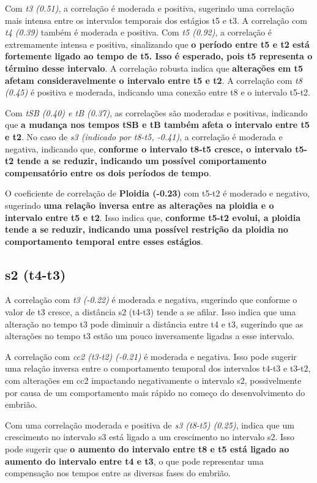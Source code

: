 Com \textit{t3 (0.51)}, a correlação é moderada e positiva, sugerindo uma correlação mais intensa entre os intervalos temporais dos estágios t5 e t3. A correlação com \textit{t4 (0.39)} também é moderada e positiva. Com \textit{t5 (0.92)}, a correlação é extremamente intensa e positiva, sinalizando que \textbf{o período entre t5 e t2 está fortemente ligado ao tempo de t5. Isso é esperado, pois t5 representa o término desse intervalo}. A correlação robusta indica que \textbf{alterações em t5 afetam consideravelmente o intervalo entre t5 e t2}. A correlação com \textit{t8 (0.45)} é positiva e moderada, indicando uma conexão entre t8 e o intervalo t5-t2.

Com \textit{tSB (0.40) e tB (0.37)}, as correlações são moderadas e positivas, indicando que \textbf{a mudança nos tempos tSB e tB também afeta o intervalo entre t5 e t2}. No caso de \textit{s3 (indicado por t8-t5, -0.41)}, a correlação é moderada e negativa, indicando que, \textbf{conforme o intervalo t8-t5 cresce, o intervalo t5-t2 tende a se reduzir, indicando um possível comportamento compensatório entre os dois períodos de tempo}.

O coeficiente de correlação de \textbf{Ploidia (-0.23)} com t5-t2 é moderado e negativo, sugerindo \textbf{uma relação inversa entre as alterações na ploidia e o intervalo entre t5 e t2}. Isso indica que, \textbf{conforme t5-t2 evolui, a ploidia tende a se reduzir, indicando uma possível restrição da ploidia no comportamento temporal entre esses estágios}. 

\subsection*{s2 (t4-t3)}
A correlação com \textit{t3 (-0.22)} é moderada e negativa, sugerindo que conforme o valor de t3 cresce, a distância s2 (t4-t3) tende a se afilar. Isso indica que uma alteração no tempo t3 pode diminuir a distância entre t4 e t3, sugerindo que as alterações no tempo t3 estão um pouco inversamente ligadas a esse intervalo.

A correlação com \textit{cc2 (t3-t2) (-0.21)} é moderada e negativa. Isso pode sugerir uma relação inversa entre o comportamento temporal dos intervalos t4-t3 e t3-t2, com alterações em cc2 impactando negativamente o intervalo s2, possivelmente por causa de um comportamento mais rápido no começo do desenvolvimento do embrião.

Com uma correlação moderada e positiva de \textit{s3 (t8-t5) (0.25)}, indica que um crescimento no intervalo s3 está ligado a um crescimento no intervalo s2. Isso pode sugerir que \textbf{o aumento do intervalo entre t8 e t5 está ligado ao aumento do intervalo entre t4 e t3}, o que pode representar uma compensação nos tempos entre as diversas fases do embrião.


